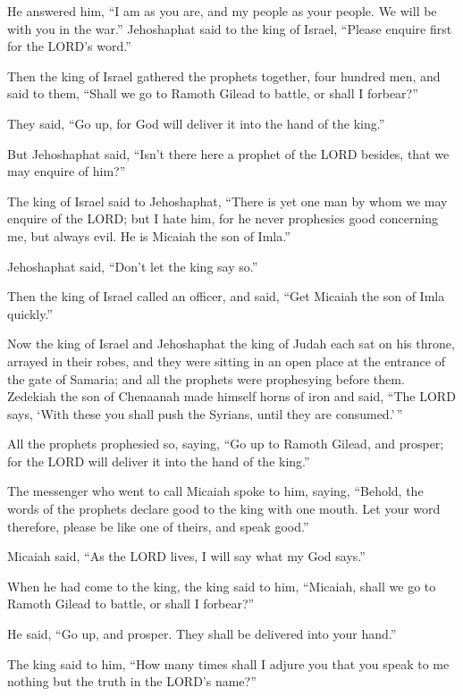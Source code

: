 He answered him, ``I am as you are, and my people as your people. We
will be with you in the war.''  Jehoshaphat said to the
king of Israel, ``Please enquire first for the LORD's word.''

 Then the king of Israel gathered the prophets together,
four hundred men, and said to them, ``Shall we go to Ramoth Gilead to
battle, or shall I forbear?''

They said, ``Go up, for God will deliver it into the hand of the king.''

 But Jehoshaphat said, ``Isn't there here a prophet of the
LORD besides, that we may enquire of him?''

 The king of Israel said to Jehoshaphat, ``There is yet
one man by whom we may enquire of the LORD; but I hate him, for he never
prophesies good concerning me, but always evil. He is Micaiah the son of
Imla.''

Jehoshaphat said, ``Don't let the king say so.''

 Then the king of Israel called an officer, and said,
``Get Micaiah the son of Imla quickly.''

 Now the king of Israel and Jehoshaphat the king of Judah
each sat on his throne, arrayed in their robes, and they were sitting in
an open place at the entrance of the gate of Samaria; and all the
prophets were prophesying before them.  Zedekiah the son
of Chenaanah made himself horns of iron and said, ``The LORD says, `With
these you shall push the Syrians, until they are consumed.'\,''

 All the prophets prophesied so, saying, ``Go up to
Ramoth Gilead, and prosper; for the LORD will deliver it into the hand
of the king.''

 The messenger who went to call Micaiah spoke to him,
saying, ``Behold, the words of the prophets declare good to the king
with one mouth. Let your word therefore, please be like one of theirs,
and speak good.''

 Micaiah said, ``As the LORD lives, I will say what my
God says.''

 When he had come to the king, the king said to him,
``Micaiah, shall we go to Ramoth Gilead to battle, or shall I forbear?''

He said, ``Go up, and prosper. They shall be delivered into your hand.''

 The king said to him, ``How many times shall I adjure
you that you speak to me nothing but the truth in the LORD's name?''

